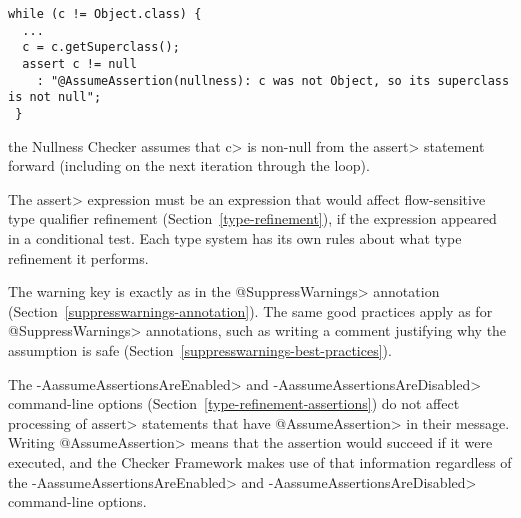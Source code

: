 \begin{Verbatim}
while (c != Object.class) {
  ...
  c = c.getSuperclass();
  assert c != null
    : "@AssumeAssertion(nullness): c was not Object, so its superclass is not null";
 }
\end{Verbatim}

\noindent
the Nullness Checker assumes that \<c> is non-null from the \<assert>
statement forward (including on the next iteration through the loop).

The \<assert> expression must be an expression that would affect flow-sensitive
type qualifier refinement (Section~\ref{type-refinement}), if the
expression appeared in a conditional test.  Each type system has its own
rules about what type refinement it performs.

The warning key is exactly as in the \<@SuppressWarnings> annotation
(Section~\ref{suppresswarnings-annotation}).  The same good practices apply
as for \<@SuppressWarnings> annotations, such as writing a comment
justifying why the assumption is safe
(Section~\ref{suppresswarnings-best-practices}).

The \<-AassumeAssertionsAreEnabled> and \<-AassumeAssertionsAreDisabled>
command-line options (Section~\ref{type-refinement-assertions}) do not
affect processing of \<assert> statements that have \<@AssumeAssertion> in
their message.  Writing \<@AssumeAssertion> means that the assertion would
succeed if it were executed, and the Checker Framework makes use of that
information regardless of the \<-AassumeAssertionsAreEnabled> and
\<-AassumeAssertionsAreDisabled> command-line options.






